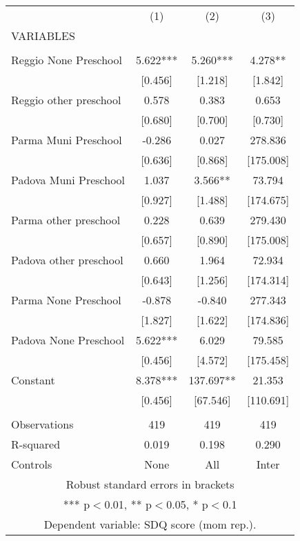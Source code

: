 \begin{tabular}{lccc} \hline
 & (1) & (2) & (3) \\
VARIABLES &  &  &  \\ \hline
 &  &  &  \\
Reggio None Preschool & 5.622*** & 5.260*** & 4.278** \\
 & [0.456] & [1.218] & [1.842] \\
Reggio other preschool & 0.578 & 0.383 & 0.653 \\
 & [0.680] & [0.700] & [0.730] \\
Parma Muni Preschool & -0.286 & 0.027 & 278.836 \\
 & [0.636] & [0.868] & [175.008] \\
Padova Muni Preschool & 1.037 & 3.566** & 73.794 \\
 & [0.927] & [1.488] & [174.675] \\
Parma other preschool & 0.228 & 0.639 & 279.430 \\
 & [0.657] & [0.890] & [175.008] \\
Padova other preschool & 0.660 & 1.964 & 72.934 \\
 & [0.643] & [1.256] & [174.314] \\
Parma None Preschool & -0.878 & -0.840 & 277.343 \\
 & [1.827] & [1.622] & [174.836] \\
Padova None Preschool & 5.622*** & 6.029 & 79.585 \\
 & [0.456] & [4.572] & [175.458] \\
Constant & 8.378*** & 137.697** & 21.353 \\
 & [0.456] & [67.546] & [110.691] \\
 &  &  &  \\
Observations & 419 & 419 & 419 \\
R-squared & 0.019 & 0.198 & 0.290 \\
 Controls & None & All & Inter \\ \hline
\multicolumn{4}{c}{ Robust standard errors in brackets} \\
\multicolumn{4}{c}{ *** p$<$0.01, ** p$<$0.05, * p$<$0.1} \\
\multicolumn{4}{c}{ Dependent variable: SDQ score (mom rep.).} \\
\end{tabular}
